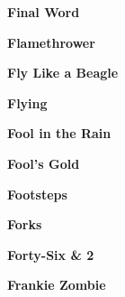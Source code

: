 \newline
\vspace{10pt} 
\begin{center}\textbf{Final Word}\end{center}
\newline
\vspace{10pt} 
\begin{center}\textbf{Flamethrower}\end{center}
\newline
\vspace{10pt} 
\begin{center}\textbf{Fly Like a Beagle}\end{center}
\newline
\vspace{10pt} 
\begin{center}\textbf{Flying}\end{center}
\newline
\vspace{10pt} 
\begin{center}\textbf{Fool in the Rain}\end{center}
\newline
\vspace{10pt} 
\begin{center}\textbf{Fool's Gold}\end{center}
\newline
\vspace{10pt} 
\begin{center}\textbf{Footsteps}\end{center}
\newline
\vspace{10pt} 
\begin{center}\textbf{Forks}\end{center}
\newline
\vspace{10pt} 
\begin{center}\textbf{Forty-Six \& 2}\end{center}
\newline
\vspace{10pt} 
\begin{center}\textbf{Frankie Zombie}\end{center}
